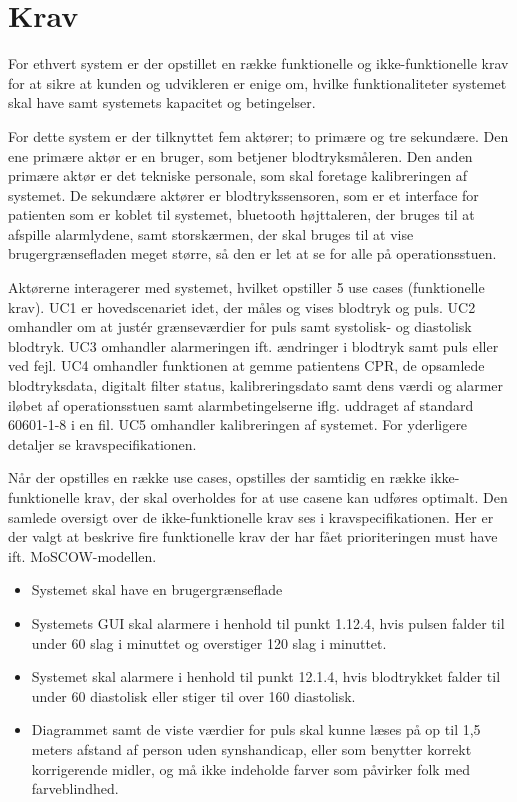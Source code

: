\section{Krav}
For ethvert system er der opstillet en række funktionelle og ikke-funktionelle krav for at sikre at kunden og udvikleren er enige om, hvilke funktionaliteter systemet skal have samt systemets kapacitet og betingelser.

For dette system er der tilknyttet fem aktører; to primære og tre sekundære. Den ene primære aktør er en bruger, som betjener blodtryksmåleren. Den anden primære aktør er det tekniske personale, som skal foretage kalibreringen af systemet. De sekundære aktører er blodtrykssensoren, som er et interface for patienten som er koblet til systemet, bluetooth højttaleren, der bruges til at afspille alarmlydene, samt storskærmen, der skal bruges til at vise brugergrænsefladen meget større, så den er let at se for alle på operationsstuen.

Aktørerne interagerer med systemet, hvilket opstiller 5 use cases (funktionelle krav). UC1 er hovedscenariet idet, der måles og vises blodtryk og puls. UC2 omhandler om at justér grænseværdier for puls samt systolisk- og diastolisk blodtryk. UC3 omhandler alarmeringen ift. ændringer i blodtryk samt puls eller ved fejl. UC4 omhandler funktionen at gemme patientens CPR, de opsamlede blodtryksdata, digitalt filter status, kalibreringsdato samt dens værdi og alarmer iløbet af operationsstuen samt alarmbetingelserne iflg. uddraget af standard 60601-1-8 i en fil. UC5 omhandler kalibreringen af systemet. For yderligere detaljer se kravspecifikationen. 

Når der opstilles en række use cases, opstilles der samtidig en række ikke-funktionelle krav, der skal overholdes for at use casene kan udføres optimalt. Den samlede oversigt over de ikke-funktionelle krav ses i kravspecifikationen. Her er der valgt at beskrive fire funktionelle krav der har fået prioriteringen must have ift. MoSCOW-modellen.

\begin{itemize}
\item Systemet skal have en brugergrænseflade \\
\item Systemets GUI skal alarmere i henhold til punkt 1.12.4, hvis pulsen
falder til under 60 slag i minuttet og overstiger 120 slag i minuttet. 
\item Systemet skal alarmere i henhold til punkt 12.1.4, hvis blodtrykket falder til under 60 diastolisk eller stiger til over 160 diastolisk. \\
\item Diagrammet samt de viste værdier for puls skal kunne læses på op til 1,5 meters afstand af person uden synshandicap, eller som benytter korrekt korrigerende midler, og må ikke indeholde farver som påvirker folk med farveblindhed. 
\end{itemize}

